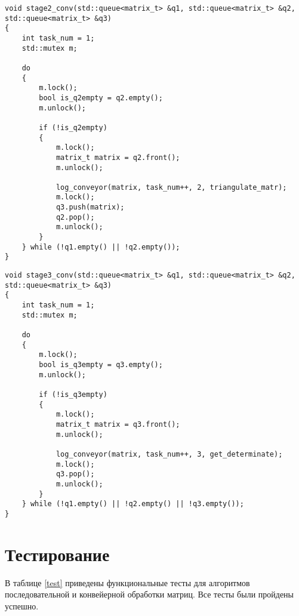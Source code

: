 \begin{lstlisting}[caption=Реализация алгоритма конвейерной обработки матриц (2-ой поток),
	label={st2}]
void stage2_conv(std::queue<matrix_t> &q1, std::queue<matrix_t> &q2, std::queue<matrix_t> &q3)
{
    int task_num = 1;
    std::mutex m;

    do
    {
        m.lock();
        bool is_q2empty = q2.empty();
        m.unlock();
        
        if (!is_q2empty)
        {
            m.lock();
            matrix_t matrix = q2.front();
            m.unlock();

            log_conveyor(matrix, task_num++, 2, triangulate_matr);
            m.lock();
            q3.push(matrix);
            q2.pop();
            m.unlock();
        }
    } while (!q1.empty() || !q2.empty());
}
\end{lstlisting}

\begin{lstlisting}[caption=Реализация алгоритма конвейерной обработки матриц (3-ий поток),
	label={st3}]
void stage3_conv(std::queue<matrix_t> &q1, std::queue<matrix_t> &q2, std::queue<matrix_t> &q3)
{
    int task_num = 1;
    std::mutex m;

    do
    {
        m.lock();
        bool is_q3empty = q3.empty();
        m.unlock();

        if (!is_q3empty)
        {
            m.lock();
            matrix_t matrix = q3.front();
            m.unlock();

            log_conveyor(matrix, task_num++, 3, get_determinate);
            m.lock();
            q3.pop();
            m.unlock();
        }
    } while (!q1.empty() || !q2.empty() || !q3.empty());
}
\end{lstlisting}

\section{Тестирование}

В таблице \ref{test} приведены функциональные тесты для алгоритмов последовательной и конвейерной обработки матриц. Все тесты были пройдены успешно.

